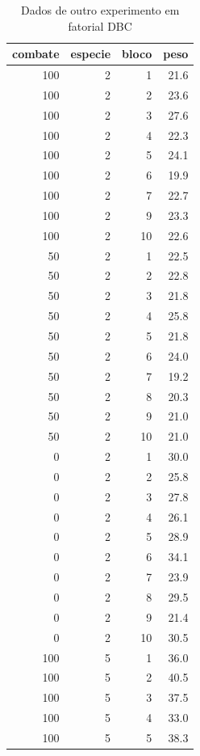 \documentclass[
]{article}
\begin{document}
\begin{table}

\caption{\label{tab:unnamed-chunk-124}Dados de outro experimento em fatorial DBC}
\centering
\begin{tabular}[t]{r|r|r|r}
\hline
combate & especie & bloco & peso\\
\hline
100 & 2 & 1 & 21.6\\
\hline
100 & 2 & 2 & 23.6\\
\hline
100 & 2 & 3 & 27.6\\
\hline
100 & 2 & 4 & 22.3\\
\hline
100 & 2 & 5 & 24.1\\
\hline
100 & 2 & 6 & 19.9\\
\hline
100 & 2 & 7 & 22.7\\
\hline
100 & 2 & 9 & 23.3\\
\hline
100 & 2 & 10 & 22.6\\
\hline
50 & 2 & 1 & 22.5\\
\hline
50 & 2 & 2 & 22.8\\
\hline
50 & 2 & 3 & 21.8\\
\hline
50 & 2 & 4 & 25.8\\
\hline
50 & 2 & 5 & 21.8\\
\hline
50 & 2 & 6 & 24.0\\
\hline
50 & 2 & 7 & 19.2\\
\hline
50 & 2 & 8 & 20.3\\
\hline
50 & 2 & 9 & 21.0\\
\hline
50 & 2 & 10 & 21.0\\
\hline
0 & 2 & 1 & 30.0\\
\hline
0 & 2 & 2 & 25.8\\
\hline
0 & 2 & 3 & 27.8\\
\hline
0 & 2 & 4 & 26.1\\
\hline
0 & 2 & 5 & 28.9\\
\hline
0 & 2 & 6 & 34.1\\
\hline
0 & 2 & 7 & 23.9\\
\hline
0 & 2 & 8 & 29.5\\
\hline
0 & 2 & 9 & 21.4\\
\hline
0 & 2 & 10 & 30.5\\
\hline
100 & 5 & 1 & 36.0\\
\hline
100 & 5 & 2 & 40.5\\
\hline
100 & 5 & 3 & 37.5\\
\hline
100 & 5 & 4 & 33.0\\
\hline
100 & 5 & 5 & 38.3\\

\end{tabular}
\end{table}
\end{document}
